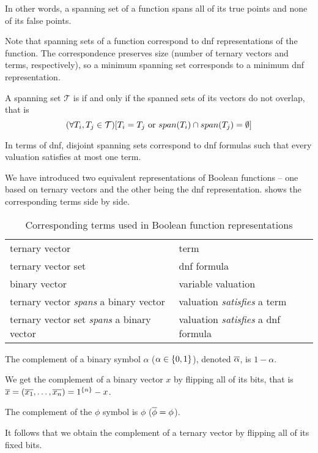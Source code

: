 In other words,
a spanning set of a function
spans all of its true points
and none of its false points.

Note that spanning sets of a function
correspond to \acrshort{dnf} representations
of the function.
The correspondence preserves size
(number of ternary vectors and terms, respectively),
so a minimum spanning set
corresponds to a minimum \acrshort{dnf} representation.

\begin{definition}
A spanning set $\mathcal{T}$ is 
if and only if the spanned sets of its vectors
do not overlap,
that is
\[
(\forall T_i, T_j \in \mathcal{T}) [T_i = T_j \text{ or }
span(T_i) \cap span(T_j) = \emptyset]
\]
\end{definition}

In terms of \acrshort{dnf},
disjoint spanning sets
correspond to \acrshort{dnf} formulas
such that every valuation satisfies at most one term.

We have introduced two equivalent representations
of Boolean functions --
one based on ternary vectors
and the other being the \acrshort{dnf} representation.
shows the corresponding terms side by side.

\begin{table}[h]
\centering
\begin{tabular}{ll}
ternary vector & term \\
ternary vector set & \acrshort{dnf} formula \\
binary vector & variable valuation \\
ternary vector \emph{spans} a binary vector &
valuation \emph{satisfies} a term \\
ternary vector set \emph{spans} a binary vector &
valuation \emph{satisfies} a \acrshort{dnf} formula
\end{tabular}
\caption{
Corresponding terms used
in Boolean function representations
}
\label{table:representations}
\end{table}

\begin{definition}
The complement of a binary symbol $\alpha$
($\alpha \in \{0, 1\}$),
denoted $\overline{\alpha}$,
is $1 - \alpha$.

We get the complement of a binary vector $x$
by flipping all of its bits,
that is $\overline{x}
= (\overline{x_1}, \ldots, \overline{x_n})
= 1^{\{n\}} - x$.

The complement of the $\phi$ symbol is $\phi$
($\overline{\phi} = \phi$).

It follows that
we obtain the complement of a ternary vector
by flipping all of its fixed bits.
\end{definition}

